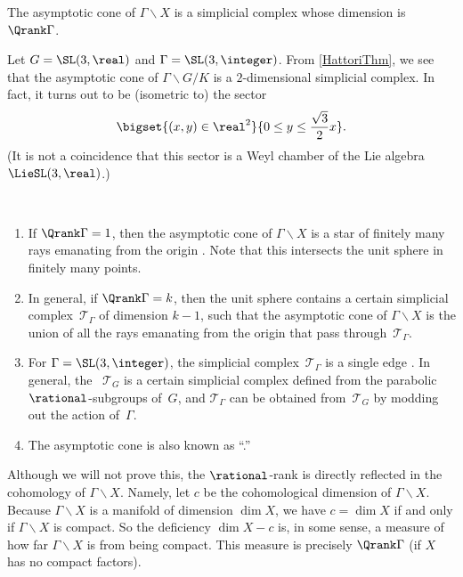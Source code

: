 \begin{thm} \label{HattoriThm}
 The asymptotic cone of\/ $\Gamma \backslash X$ is a
simplicial complex whose dimension is\/ $\Qrank\Gamma$.
 \end{thm}

\begin{eg} \label{TanConeSL3Z}
 Let $G = \SL(3,\real)$ and $\Gamma = \SL(3,\integer)$. From
\cref{HattoriThm}, we see that the asymptotic cone of
$\Gamma \backslash G/K$ is a $2$-dimensional simplicial complex. In
fact, it turns out to be (isometric to) the sector
 $$ \bigset{ (x,y) \in \real^2 }{ 0 \le y \le \frac{\sqrt{3}}{2} x }
 .$$
 (It is not a coincidence that this sector is a Weyl chamber of
the Lie algebra $\LieSL(3,\real)$.)
 \end{eg}

\begin{rems} \ 
\noprelistbreak
 \begin{enumerate}
 \item If $\Qrank \Gamma = 1$, then the asymptotic cone of
$\Gamma \backslash X$ is a star of finitely many rays emanating from the
origin \fullccf{TanConeEgs}{rank1}. Note that this intersects the unit sphere
in finitely many points.
 \item In general, if $\Qrank \Gamma = k$, then  the unit sphere
contains a certain simplicial complex~$\mathcal{T}_\Gamma$ of dimension
$k - 1$, such that the asymptotic cone of $\Gamma \backslash X$
is the union of all the rays emanating from the origin that pass
through~$\mathcal{T}_\Gamma$.
 \item For $\Gamma = \SL(3,\integer)$, the simplicial
complex~$\mathcal{T}_\Gamma$ is a single edge . In
general, the \term{Tits building}~$\mathcal{T}_G$ is a certain
simplicial complex defined from the parabolic $\rational$-subgroups
of~$G$, and $\mathcal{T}_\Gamma$ can be obtained from~$\mathcal{T}_G$ by
modding out the action of~$\Gamma$.
\item The asymptotic cone is also known as ``\zz.''
 \end{enumerate}
 \end{rems}

\begin{rem} \label{BScohodim}
Although we will not prove this, the $\rational$-rank is directly reflected in the cohomology of $\Gamma \backslash X$. Namely, let $c$ be the cohomological dimension of $\Gamma \backslash X$. Because 
$\Gamma \backslash X$ is a manifold of dimension $\dim X$, we have 
 $c = \dim X$ if and only if $\Gamma \backslash X$ is compact. So the deficiency $\dim
X - c$ is, in some sense, a measure of how far $\Gamma \backslash X$ is
from being compact. This measure is precisely $\Qrank\Gamma$ (if $X$ has no compact factors).
\end{rem}

